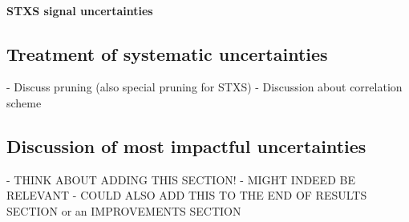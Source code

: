 \paragraph{STXS signal uncertainties}



\subsection{Treatment of systematic uncertainties}
- Discuss pruning (also special pruning for STXS)
- Discussion about correlation scheme


\subsection{Discussion of most impactful uncertainties}

- THINK ABOUT ADDING THIS SECTION!
- MIGHT INDEED BE RELEVANT 
- COULD ALSO ADD THIS TO THE END OF RESULTS SECTION or an IMPROVEMENTS SECTION
